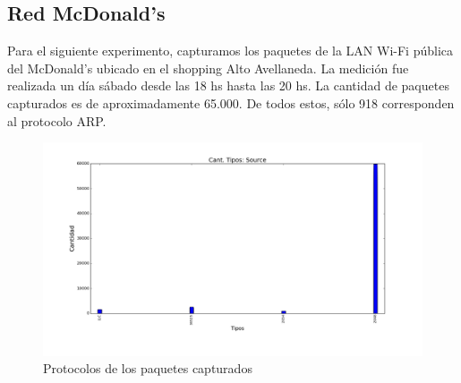 \subsection{Red McDonald's}

Para el siguiente experimento, capturamos los paquetes de la LAN Wi-Fi pública del McDonald's ubicado en el shopping Alto Avellaneda. La medición fue realizada un día sábado desde las 18 hs hasta las 20 hs. La cantidad de paquetes capturados es de aproximadamente 65.000. De todos estos, sólo 918 corresponden al protocolo ARP.

\begin{figure}[H]
       \centering
       \includegraphics[width=1\textwidth]{../resultados/McDonalds/Basename_Source_hist}
       \caption{Protocolos de los paquetes capturados}
       \label{red-hogarena-types}
\end{figure}

